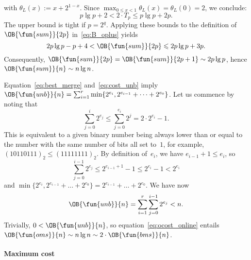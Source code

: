 with \(\theta_L(x) := x + 2^{1 - x}\). Since \(\max_{0 \leqslant x <
  1}\theta_L(x) = \theta_L(0) = 2\), we conclude:
\begin{equation*}
p\lg p + 2 < 2 \cdot T_p \leqslant p\lg p + 2p.
\end{equation*}
The upper bound is tight if \(p=2^q\). Applying these bounds to the
definition of~\(\OB{\fun{sum}}{2p}\) in~\eqref{eq:B_oplus} yields
\begin{equation}
2p\lg p - p + 4 < \OB{\fun{sum}}{2p} \leqslant 2p\lg p + 3p.
\label{ineq:B_oplus_2p}
\end{equation}
Consequently, \(\OB{\fun{sum}}{2p} = \OB{\fun{sum}}{2p+1} \sim 2p\lg
p\), hence \(\OB{\fun{sum}}{n} \sim n\lg n\).

\bigskip

\noindent Equation~\eqref{eq:best_merge} and~\eqref{eq:cost_unb} imply
\(\OB{\fun{unb}}{n} = \sum_{i=1}^{r}{\min\{2^{e_i},2^{e_{i-1}} + \dots
  + 2^{e_0}\}}\). Let us commence by
noting that
\begin{equation*}
  \sum_{j=0}^{i}{2^{e_j}} \leqslant \sum_{j=0}^{e_i}{2^j} = 2 \cdot
  2^{e_i} - 1.
\end{equation*}
This is equivalent to a given binary number being always lower than or
equal to the number with the same number of bits all set to~\(1\), for
example, \((10110111)_2 \leqslant (11111111)_2\). By definition
of~\(e_i\), we have \(e_{i-1} + 1 \leqslant e_i\), so
\begin{equation*}
  \sum_{j=0}^{i-1}{2^{e_j}} \leqslant 2^{e_{i-1}+1} - 1 \leqslant 2^{e_i} - 1 < 2^{e_i}
\end{equation*}
and \(\min\{2^{e_i},2^{e_{i-1}} + \dots + 2^{e_0}\} = 2^{e_{i-1}} +
\dots + 2^{e_0}\). We have now
\begin{equation}
\OB{\fun{unb}}{n} = \sum_{i=1}^{r}\sum_{j=0}^{i-1}{2^{e_j}} < n.
\label{ineq:OBunb}
\end{equation}
Trivially, \(0 < \OB{\fun{unb}}{n}\), so
equation~\eqref{eq:ocost_online} entails \(\OB{\fun{oms}}{n}
\sim n\lg n \sim 2 \cdot \OB{\fun{bms}}{n}\).

\paragraph{Maximum cost}

